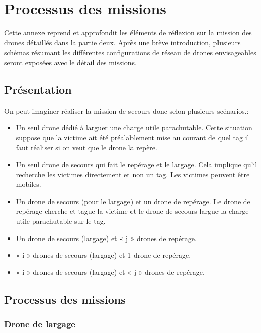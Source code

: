 \section{Processus des missions}

Cette annexe reprend et approfondit les éléments de réflexion sur la mission
des drones détaillés dans la partie deux. Après une brève introduction,
plusieurs schémas résumant les différentes configurations de réseau de
drones envisageables seront exposées avec le détail des missions.

\subsection{Présentation}

On peut imaginer réaliser la mission de secours donc selon plusieurs
scénarios.:\newline

\begin{itemize}
\item  Un seul drone dédié à larguer une charge utile parachutable. Cette situation suppose que la
  victime ait été préalablement mise au courant de quel tag il faut réaliser si on veut que le
     drone la repère.
\item  Un seul drone de secours qui fait le repérage et le largage. Cela
  implique qu’il recherche les victimes directement et non un tag. Les
  victimes peuvent être mobiles.
\item  Un drone de secours (pour le largage) et un drone de repérage. Le drone de repérage cherche
 et tague la victime et le drone de secours largue la charge utile parachutable sur le tag.
\item Un drone de secours (largage) et « j » drones de repérage.
\item  « i » drones de secours (largage) et 1 drone de repérage.
\item  « i » drones de secours (largage) et « j » drones de
    repérage.\newline

\end{itemize}

\subsection{Processus des missions}

\subsubsection{Drone de largage}

